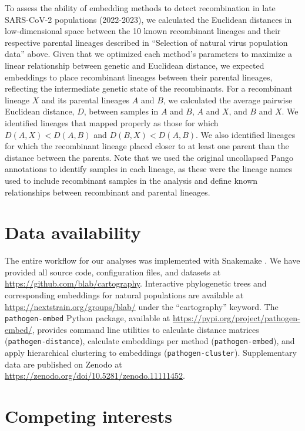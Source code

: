 \documentclass[webpdf,contemporary,large,single]{oup-authoring-template}%
\theoremstyle{thmstyleone}%
\theoremstyle{thmstyletwo}%
\theoremstyle{thmstylethree}%
\begin{document}
To assess the ability of embedding methods to detect recombination in late SARS-CoV-2 populations (2022-2023), we calculated the Euclidean distances in low-dimensional space between the 10 known recombinant lineages and their respective parental lineages described in ``Selection of natural virus population data'' above.
Given that we optimized each method's parameters to maximize a linear relationship between genetic and Euclidean distance, we expected embeddings to place recombinant lineages between their parental lineages, reflecting the intermediate genetic state of the recombinants.
For a recombinant lineage $X$ and its parental lineages $A$ and $B$, we calculated the average pairwise Euclidean distance, $D$, between samples in $A$ and $B$, $A$ and $X$, and $B$ and $X$.
We identified lineages that mapped properly as those for which $D(A, X) < D(A, B)$ and $D(B, X) < D(A, B)$.
We also identified lineages for which the recombinant lineage placed closer to at least one parent than the distance between the parents.
Note that we used the original uncollapsed Pango annotations to identify samples in each lineage, as these were the lineage names used to include recombinant samples in the analysis and define known relationships between recombinant and parental lineages.

\section*{Data availability}

The entire workflow for our analyses was implemented with Snakemake \citep{molder_2021}.
We have provided all source code, configuration files, and datasets at \href{https://github.com/blab/cartography}{https://github.com/blab/cartography}.
Interactive phylogenetic trees and corresponding embeddings for natural populations are available at \href{https://nextstrain.org/groups/blab/}{https://nextstrain.org/groups/blab/} under the ``cartography'' keyword.
The \texttt{pathogen-embed} Python package, available at \href{https://pypi.org/project/pathogen-embed/}{https://pypi.org/project/pathogen-embed/}, provides command line utilities to calculate distance matrices (\texttt{pathogen-distance}), calculate embeddings per method (\texttt{pathogen-embed}), and apply hierarchical clustering to embeddings (\texttt{pathogen-cluster}).
Supplementary data are published on Zenodo at \href{https://zenodo.org/doi/10.5281/zenodo.11111452}{https://zenodo.org/doi/10.5281/zenodo.11111452}.

\section*{Competing interests}
\end{document}

